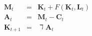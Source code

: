 \begin{eqnarray}
    \mathbf{M}_{t}  & = & \mathbf{K}_{t}+F(\mathbf{K}_{t},\mathbf{L}_{t})
\\  \mathbf{A}_{t}  & = & \mathbf{M}_{t}-\mathbf{C}_{t}
\\  \mathbf{K}_{t+1} & = & \daleth \mathbf{A}_{t}
\end{eqnarray}
